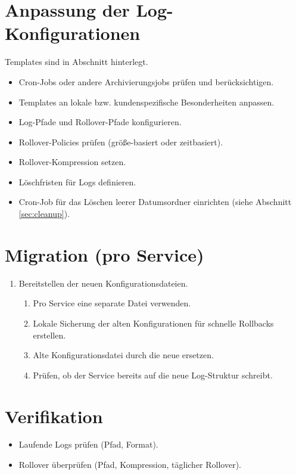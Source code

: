 \section{Anpassung der Log-Konfigurationen}
Templates sind in Abschnitt \textit{} hinterlegt.
\begin{itemize}
    \item Cron-Jobs oder andere Archivierungsjobs prüfen und berücksichtigen.
    \item Templates an lokale bzw. kundenspezifische Besonderheiten anpassen.
    \item Log-Pfade und Rollover-Pfade konfigurieren.
    \item Rollover-Policies prüfen (größe-basiert oder zeitbasiert).
    \item Rollover-Kompression setzen.
    \item Löschfristen für Logs definieren.
    \item Cron-Job für das Löschen leerer Datumsordner einrichten (siehe Abschnitt \ref{sec:cleanup}).
\end{itemize}

\section{Migration (pro Service)}
\begin{enumerate}
    \item Bereitstellen der neuen Konfigurationsdateien.
    \begin{enumerate}
        \item Pro Service eine separate Datei verwenden.
        \item Lokale Sicherung der alten Konfigurationen für schnelle Rollbacks erstellen.
        \item Alte Konfigurationsdatei durch die neue ersetzen.
        \item Prüfen, ob der Service bereits auf die neue Log-Struktur schreibt.
    \end{enumerate}
\end{enumerate}

\section{Verifikation}
\begin{itemize}
    \item Laufende Logs prüfen (Pfad, Format).
    \item Rollover überprüfen (Pfad, Kompression, täglicher Rollover).
\end{itemize}

